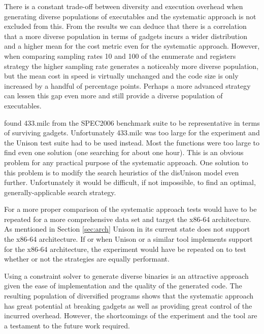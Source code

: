 There is a constant trade-off between diversity and execution overhead when generating
diverse populations of executables and the systematic approach is not excluded from this.
From the results we can deduce that there is a correlation that a more diverse population
in terms of gadgets incurs a wider distribution and a higher mean for the cost metric even
for the systematic approach. However, when comparing sampling rates 10 and 100 of the
enumerate and registers strategy the higher sampling rate generates a noticeably more
diverse population, but the mean cost in speed is virtually unchanged and the code size is
only increased by a handful of percentage points. Perhaps a more advanced strategy can
lessen this gap even more and still provide a diverse population of executables.

\textcite{large-scale-automated} found 433.milc from the SPEC2006 benchmark suite to be
representative in terms of surviving gadgets. Unfortunately 433.milc was too large for the
experiment and the Unison test suite had to be used instead. Most the functions were too
large to find even one solution (one searching for about one hour). This is an obvious
problem for any practical purpose of the systematic approach. One solution to this problem
is to modify the search heuristics of the disUnison model even further. Unfortunately it
would be difficult, if not impossible, to find an optimal, generally-applicable search
strategy.

For a more proper comparison of the systematic approach tests would have to be repeated for
a more comprehensive data set and target the x86-64 architecture. As mentioned in Section
\ref{sec:arch} Unison in its current state does not support the x86-64 architecture. If or
when Unison or a similar tool implements support for the x86-64 architecture, the
experiment would have be repeated on to test whether or not the strategies are equally
performant.

Using a constraint solver to generate diverse binaries is an attractive approach given
the ease of implementation and the quality of the generated code. The resulting population
of diversified programs shows that the systematic approach has great potential at breaking
gadgets as well as providing great control of the incurred overhead. However, the
shortcomings of the experiment and the tool are a testament to the future work required.
